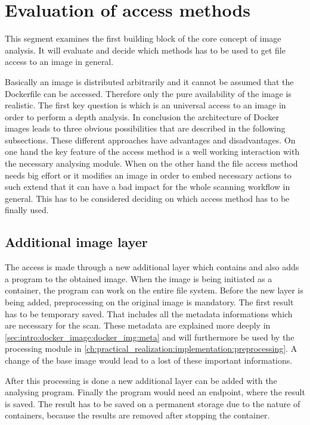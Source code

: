 \section{Evaluation of access methods}
\label{ch:theory:access_eval}
This segment examines the first building block of the core concept of image analysis. It will evaluate and decide which methods has to be used to get file access to an image in general.

Basically an image is distributed arbitrarily and it cannot be assumed that the Dockerfile can be accessed.
Therefore only the pure availability of the image is realistic. The first key question is which is an universal access to an image in order to perform a depth analysis.
In conclusion the architecture of Docker images leads to three obvious possibilities that are described in the following subsections.
These different approaches have advantages and disadvantages. On one hand the key feature of the access method is a well working interaction with the necessary analysing module. When on the other hand the file access method needs big effort or it modifies an image in order to embed necessary actions to such extend that it can have a bad impact for the whole scanning workflow in general. This has to be considered deciding on which access method has to be finally used.

\subsection{Additional image layer} 
\label{ch:theory:access_eval:additional}
The access is made through a new additional layer which contains and also adds a program to the obtained image. When the image is being initiated as a container, the program can work on the entire file system.
Before the new layer is being added, preprocessing on the original image is mandatory. The first result has to be temporary saved. That includes all the metadata informations which are necessary for the scan. These metadata are explained more deeply in \ref{sec:intro:docker_image:docker_img:meta} and will furthermore be used by the processing module in \ref{ch:practical_realization:implementation:preprocessing}. A change of the base image would lead to a lost of these important informations. 

After this processing is done a new additional layer can be added with the analysing program.
Finally the program would need an endpoint, where the result is saved. The result has to be saved on a permanent storage due to the nature of containers, because the results are removed after stopping the container. 

